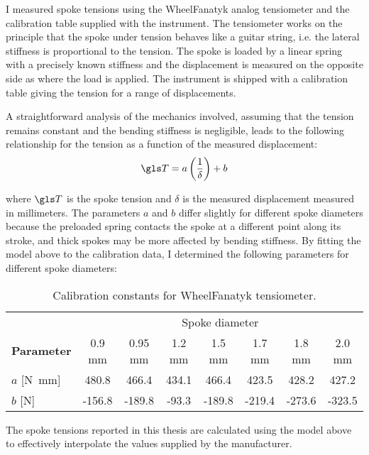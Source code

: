 \documentclass[../../thesis.tex]{subfiles}
\begin{document}
I measured spoke tensions using the WheelFanatyk analog tensiometer and the calibration table supplied with the instrument. The tensiometer works on the principle that the spoke under tension behaves like a guitar string, i.e. the lateral stiffness is proportional to the tension. The spoke is loaded by a linear spring with a precisely known stiffness and the displacement is measured on the opposite side as where the load is applied. The instrument is shipped with a calibration table giving the tension for a range of displacements.

A straightforward analysis of the mechanics involved, assuming that the tension remains constant and the bending stiffness is negligible, leads to the following relationship for the tension as a function of the measured displacement:
\begin{equation}
\T = a\left(\frac{1}{\delta}\right) + b
\end{equation}

where $\T$ is the spoke tension and $\delta$ is the measured displacement measured in millimeters. The parameters $a$ and $b$ differ slightly for different spoke diameters because the preloaded spring contacts the spoke at a different point along its stroke, and thick spokes may be more affected by bending stiffness. By fitting the model above to the calibration data, I determined the following parameters for different spoke diameters:

\begin{table}[h]
\caption[Calibration constants for WheelFanatyk tensiometer]{Calibration constants for WheelFanatyk tensiometer.}
\begin{tabular}{lccccccc}
\toprule
&\multicolumn{7}{c}{Spoke diameter}\\
\cmidrule(r){2-8}
\bf Parameter & 0.9 mm & 0.95 mm & 1.2 mm & 1.5 mm & 1.7 mm & 1.8 mm & 2.0 mm\\
\midrule
$a$ [\si{N.mm}] &  480.8 &  466.4 & 434.1 &  466.4 &  423.5 &  428.2 &  427.2\\
$b$ [\si{N}]    & -156.8 & -189.8 & -93.3 & -189.8 & -219.4 & -273.6 & -323.5\\
\bottomrule
\end{tabular}
\end{table}

The spoke tensions reported in this thesis are calculated using the model above to effectively interpolate the values supplied by the manufacturer.
\end{document}

